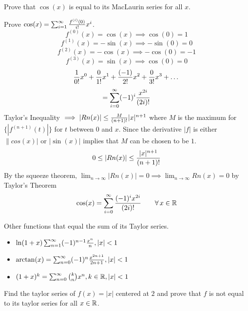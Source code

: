 \documentclass[english, 12pt]{article}
\begin{document}
\begin{exmp}
Prove that $\cos(x)$ is equal to its MacLaurin series for all $x$.
\begin{sol}
Prove $\cos(x) = \sum_{i=1}^\infty \frac{f^{(i)}(0)}{i!} x^i$.
\[f^{(0)}(x) = \cos(x) \implies \cos(0) = 1\]
\[f^{(1)}(x) = - \sin(x) \implies - \sin(0) = 0\]
\[f^{(2)}(x) = - \cos(x) \implies - \cos(0) = -1\]
\[f^{(3)}(x) = \sin(x) \implies \cos(0) = 0\]
\[ \frac{1}{0!} x^0 + \frac{0}{1!} x^1 + \frac{(-1)}{2!} x^2 + \frac{0}{3!} x^3 + \dots\]
\[ = \sum_{i=0}^\infty (-1)^i \frac{x^{2i}}{(2i)!}\]
Taylor's Inequality $\implies |Rn(x)| \leq \frac{M}{(n+1)!} |x|^{n+1}$ where $M$ is the maximum for $\{|f^{(n+1)} (t)|\}$ for $t$ between $0$ and $x$.
Since the derivative  $|f|$ is either $\|cos(x)|$ or $|\sin(x)|$ implies that $M$ can be chosen to be $1$.
\[0 \leq |Rn(x)| \leq \frac{|x|^{n+1}}{(n+1)!}\]
By the squeeze theorem, $\lim_{n\to\infty} |Rn(x)| = 0 \implies \lim_{n\to\infty} Rn(x) = 0 $ by Taylor's Theorem
\[ \cos (x) = \sum_{i=0}^\infty \frac{(-1)^i x^{2i}}{(2i)!}\qquad \forall \, x \in {\mathbb{R}}\]
\end{sol}
\end{exmp}
Other functions that equal the sum of its Taylor series.
\begin{itemize}
\item $\ln (1 + x)  \sum_{n=1}^\infty (-1)^{n-1} \frac{x^n}{n}, |x| < 1$
\item $\arctan(x) = \sum_{n=0}^\infty (-1)^n \frac{x^{2n+1}}{2n+1},|x| < 1$
\item $(1+x)^k = \sum_{n=0}^\infty {k \choose n} x^n,k \in {\mathbb{R}}, |x| < 1$
\end{itemize}
\begin{exercise}
Find the taylor series of $f(x) = |x|$ centered at $2$ and prove that $f$ is not equal to its taylor series for all $x \in {\mathbb{R}}$.
\end{exercise}
\end{document}
